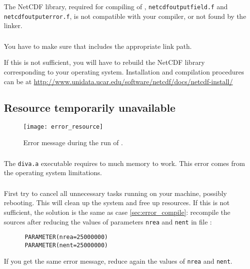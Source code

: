 The NetCDF library, required for compiling of , \texttt{netcdf\-output\-field.f} and \texttt{netcdf\-output\-error.f}, is not compatible with your compiler, or not found by the linker.

\subsubsection{\answer}

You have to make sure that  includes the appropriate link path.

If this is not sufficient, you will have to rebuild the NetCDF library corresponding to your operating system. Installation and compilation procedures can be at \url{http://www.unidata.ucar.edu/software/netcdf/docs/netcdf-install/}



\subsection[Resource temporarily unavailable]{Resource temporarily unavailable\label{sec:error_resource}}


\begin{figure}[htpb]
\centering
\texttt{[image: error\_resource]}
\caption{Error message during the run of \label{fig:error_resource}.}
\end{figure}

\subsubsection{\question}

The \texttt{diva.a} executable requires to much memory to work. This error comes from the operating system limitations.

\subsubsection{\answer}
First try to cancel all unnecessary tasks running on your machine, possibly rebooting. This will clean up the system and free up resources. If this is not sufficient, the solution is the same as case \ref{sec:error_compile}: recompile the sources after reducing the values of parameters \texttt{nrea} and \texttt{nent} in file :
\begin{verbatim}
      PARAMETER(nrea=25000000)
      PARAMETER(nent=25000000)
\end{verbatim}
If you get the same error message, reduce again the values of \texttt{nrea} and \texttt{nent}.

